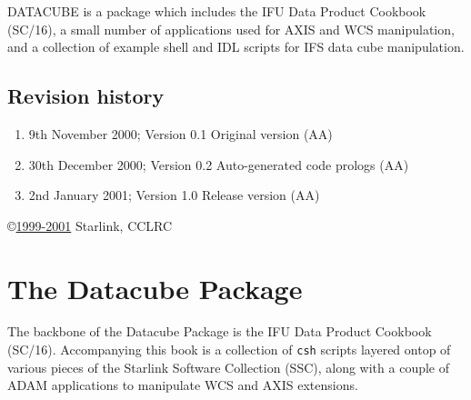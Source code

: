 \documentclass[twoside,11pt]{article}
\newcommand{\stardocinitials}  {SUN}
\newcommand{\stardocnumber}    {237.1}
\newcommand{\stardocabstract}  {  
\htmlref{DATACUBE}{DATACUBE} is a package which includes the IFU Data Product Cookbook (\xref{SC/16}{sc16}{}), a small number of applications used for AXIS and WCS manipulation, and a collection of example shell and IDL scripts for IFS data cube manipulation.
}
\newcommand{\stardocname}{\stardocinitials /\stardocnumber}
\newenvironment{latexonly}{}{}
\newcommand{\htmlref}[2]{#1}
\newcommand{\xref}[3]{#1}
\newcommand{\xlabel}[1]{}
\newcommand{\latexonlytoc}[0]{\tableofcontents}
\renewcommand{\thepage}{\roman{page}}
\begin{document}
\stardocabstract
 \newpage
 \vspace{3cm}

 \subsection*{Revision history}

 \begin{enumerate}
   \item 9th November 2000; Version 0.1 Original version (AA) 
   \item 30th December 2000; Version 0.2 Auto-generated code prologs (AA)
   \item 2nd January 2001; Version 1.0 Release version (AA)

 \end{enumerate}

 \vspace{10cm}
 \copyright \underline{1999-2001} Starlink, CCLRC

 \cleardoublepage
 \begin{latexonly}
   \setlength{\parskip}{0mm}
   \latexonlytoc

   \newpage
   \listoffigures

   \setlength{\parskip}{\medskipamount}
   \markright{\stardocname}
 \end{latexonly}

\cleardoublepage
\newpage
\renewcommand{\thepage}{\arabic{page}}
\setcounter{page}{1}


\section{\xlabel{sun237_intro}The Datacube Package\label{sun237_intro}}

The backbone of the Datacube Package is the \xref{IFU Data Product Cookbook}{sc16}{} (SC/16). Accompanying this book is a collection of {\tt csh} scripts layered ontop of various pieces of the Starlink Software Collection (SSC), along with a couple of ADAM applications to manipulate WCS and AXIS extensions.
\end{document}
